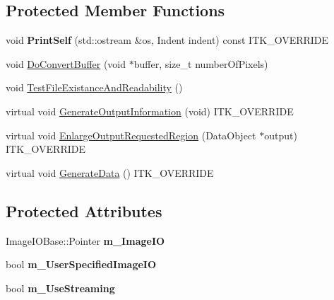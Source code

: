 \subsection*{Protected Member Functions}
\begin{DoxyCompactItemize}
\item 
\hypertarget{classitk_1_1_image_file_reader_k_w_abeb559364dac015e1430ef6fa0086d33}{void {\bfseries Print\-Self} (std\-::ostream \&os, Indent indent) const I\-T\-K\-\_\-\-O\-V\-E\-R\-R\-I\-D\-E}\label{classitk_1_1_image_file_reader_k_w_abeb559364dac015e1430ef6fa0086d33}

\item 
void \hyperlink{classitk_1_1_image_file_reader_k_w_a36590b67313b769b377ab84dab64e6dc}{Do\-Convert\-Buffer} (void $\ast$buffer, size\-\_\-t number\-Of\-Pixels)
\item 
void \hyperlink{classitk_1_1_image_file_reader_k_w_a68e1c6d1289530941de1424844f481b5}{Test\-File\-Existance\-And\-Readability} ()
\item 
virtual void \hyperlink{classitk_1_1_image_file_reader_k_w_a5fc2235fca283e451de26035fd237cda}{Generate\-Output\-Information} (void) I\-T\-K\-\_\-\-O\-V\-E\-R\-R\-I\-D\-E
\item 
virtual void \hyperlink{classitk_1_1_image_file_reader_k_w_a313f37f91aad5e0c91fe9b37b9f1e156}{Enlarge\-Output\-Requested\-Region} (Data\-Object $\ast$output) I\-T\-K\-\_\-\-O\-V\-E\-R\-R\-I\-D\-E
\item 
virtual void \hyperlink{classitk_1_1_image_file_reader_k_w_a1096f13bf512a24092565fa6a3a82508}{Generate\-Data} () I\-T\-K\-\_\-\-O\-V\-E\-R\-R\-I\-D\-E
\end{DoxyCompactItemize}
\subsection*{Protected Attributes}
\begin{DoxyCompactItemize}
\item 
\hypertarget{classitk_1_1_image_file_reader_k_w_ad8257c25171cf6c698f19ece08189535}{Image\-I\-O\-Base\-::\-Pointer {\bfseries m\-\_\-\-Image\-I\-O}}\label{classitk_1_1_image_file_reader_k_w_ad8257c25171cf6c698f19ece08189535}

\item 
\hypertarget{classitk_1_1_image_file_reader_k_w_ab7a9a3dacdffcbfca83153ff40665ac4}{bool {\bfseries m\-\_\-\-User\-Specified\-Image\-I\-O}}\label{classitk_1_1_image_file_reader_k_w_ab7a9a3dacdffcbfca83153ff40665ac4}

\item 
\hypertarget{classitk_1_1_image_file_reader_k_w_a7b56980da3e50436905c3ae5731fc557}{bool {\bfseries m\-\_\-\-Use\-Streaming}}\label{classitk_1_1_image_file_reader_k_w_a7b56980da3e50436905c3ae5731fc557}

\end{DoxyCompactItemize}


